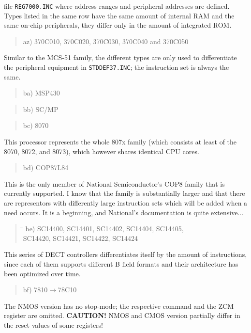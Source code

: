 \documentclass[12pt,twoside]{report}
\newcommand{\bb}[1]{{\bf #1}}
\newcommand{\tty}[1]{{\tt #1}}
\begin{document}
file \tty{REG7000.INC} where address ranges and peripheral addresses are
defined.  Types listed in the same row have the same amount of internal
RAM and the same on-chip peripherals, they differ only in the amount of
integrated ROM.
\begin{quote}
az) 370C010, 370C020, 370C030, 370C040 and 370C050
\end{quote}
Similar to the MCS-51 family, the different types are only used to
differentiate the peripheral equipment in \tty{STDDEF37.INC}; the
instruction set is always the same.
\begin{quote}
ba) MSP430
\end{quote}
\begin{quote}
bb) SC/MP
\end{quote}
\begin{quote}
bc) 8070
\end{quote}
This processor represents the whole 807x family (which consists at least
of the 8070, 8072, and 8073), which however shares identical CPU cores.
\begin{quote}
bd) COP87L84
\end{quote}
This is the only member of National Semiconductor's COP8 family that
is currently supported.  I know that the family is substantially
larger and that there are representors with differently large
instruction sets which will be added when a need occurs.  It is a
beginning, and National's documentation is quite extensive... 
\begin{quote}
\begin{tabbing}
\hspace{0.7cm} \= \kill
be) \> SC14400, SC14401, SC14402, SC14404, SC14405, \\
    \> SC14420, SC14421, SC14422, SC14424 \\
\end{tabbing}
\end{quote}
This series of DECT controllers differentiates itself by the amount of
instructions, since each of them supports different B field formats and
their architecture has been optimized over time.
\begin{quote}
bf) 7810$\rightarrow$78C10
\end{quote}
The NMOS version has no stop-mode; the respective command and the ZCM
register are omitted.  \bb{CAUTION!}  NMOS and CMOS version partially
differ in the reset values of some registers!
\end{document}
